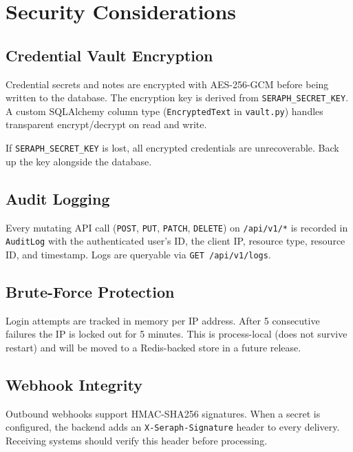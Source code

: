 \documentclass[11pt,a4paper,twoside,openright]{book}
\begin{document}
\chapter{Security Considerations}

\section{Credential Vault Encryption}

Credential secrets and notes are encrypted with AES-256-GCM before being written to the database. The encryption key is derived from \texttt{SERAPH\_SECRET\_KEY}. A custom SQLAlchemy column type (\texttt{EncryptedText} in \texttt{vault.py}) handles transparent encrypt/decrypt on read and write.

\begin{warningbox}
If \texttt{SERAPH\_SECRET\_KEY} is lost, all encrypted credentials are unrecoverable. Back up the key alongside the database.
\end{warningbox}

\section{Audit Logging}

Every mutating API call (\texttt{POST}, \texttt{PUT}, \texttt{PATCH}, \texttt{DELETE}) on \texttt{/api/v1/*} is recorded in \texttt{AuditLog} with the authenticated user's ID, the client IP, resource type, resource ID, and timestamp. Logs are queryable via \texttt{GET /api/v1/logs}.

\section{Brute-Force Protection}

Login attempts are tracked in memory per IP address. After 5 consecutive failures the IP is locked out for 5 minutes. This is process-local (does not survive restart) and will be moved to a Redis-backed store in a future release.

\section{Webhook Integrity}

Outbound webhooks support HMAC-SHA256 signatures. When a secret is configured, the backend adds an \texttt{X-Seraph-Signature} header to every delivery. Receiving systems should verify this header before processing.
\end{document}
